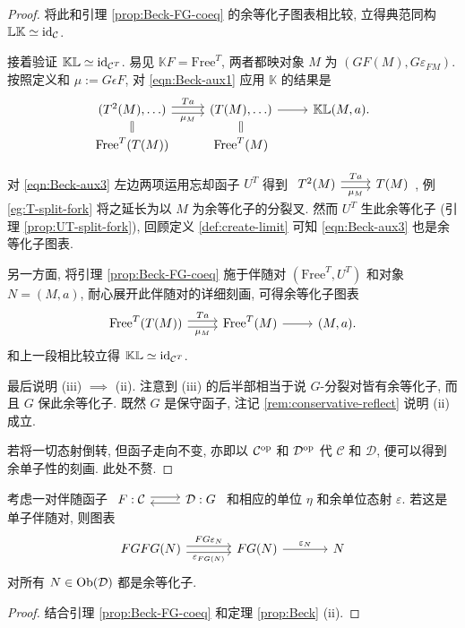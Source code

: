 \begin{proof}
	将此和引理 \ref{prop:Beck-FG-coeq} 的余等化子图表相比较, 立得典范同构 $\mathbb{L}\mathbb{K} \simeq \mathrm{id}_{\mathcal{C}}$.
	
	接着验证 $\mathbb{K}\mathbb{L} \simeq \mathrm{id}_{\mathcal{C}^T}$. 易见 $\mathbb{K}F = \mathrm{Free}^T$, 两者都映对象 $M$ 为 $(GF(M), G\varepsilon_{FM})$. 按照定义和 $\mu := G\epsilon F$, 对 \eqref{eqn:Beck-aux1} 应用 $\mathbb{K}$ 的结果是
	\begin{equation}\label{eqn:Beck-aux3}
		\begin{tikzcd}[row sep=small]
			(T^2(M), \ldots) \arrow[shift left, r, "Ta"] \arrow[shift right, r, "\mu_M"'] & (T(M), \ldots) \arrow[r] & \mathbb{K}\mathbb{L}(M, a). \\
			\mathrm{Free}^T(T(M)) \arrow[equal, u] & \mathrm{Free}^T(M) \arrow[equal, u] &
		\end{tikzcd}
	\end{equation}

	对 \eqref{eqn:Beck-aux3} 左边两项运用忘却函子 $U^T$ 得到
	$\begin{tikzcd}
		T^2(M) \arrow[shift left, r, "{Ta}"] \arrow[shift right, r, "{\mu_M}"'] & T(M)
	\end{tikzcd}$,
	例 \ref{eg:T-split-fork} 将之延长为以 $M$ 为余等化子的分裂叉. 然而 $U^T$ 生此余等化子 (引理 \ref{prop:UT-split-fork}), 回顾定义 \ref{def:create-limit} 可知 \eqref{eqn:Beck-aux3} 也是余等化子图表.
	
	另一方面, 将引理 \ref{prop:Beck-FG-coeq} 施于伴随对 $(\mathrm{Free}^T, U^T)$ 和对象 $N = (M, a)$, 耐心展开此伴随对的详细刻画, 可得余等化子图表
	\[\begin{tikzcd}[row sep=tiny]
		\mathrm{Free}^T(T(M)) \arrow[shift left, r, "Ta"] \arrow[shift right, r, "\mu_M"'] & \mathrm{Free}^T(M) \arrow[r] & (M, a).
	\end{tikzcd}\]
	和上一段相比较立得 $\mathbb{K}\mathbb{L} \simeq \mathrm{id}_{\mathcal{C}^T}$.
	
	最后说明 (iii) $\implies$ (ii). 注意到 (iii) 的后半部相当于说 $G$-分裂对皆有余等化子, 而且 $G$ 保此余等化子. 既然 $G$ 是保守函子, 注记 \ref{rem:conservative-reflect} 说明 (ii) 成立.
	
	若将一切态射倒转, 但函子走向不变, 亦即以 $\mathcal{C}^{\operatorname{op}}$ 和 $\mathcal{D}^{\operatorname{op}}$ 代 $\mathcal{C}$ 和 $\mathcal{D}$, 便可以得到余单子性的刻画. 此处不赘.
\end{proof}

\begin{corollary}
	考虑一对伴随函子
	$\begin{tikzcd}
		F: \mathcal{C} \arrow[shift left, r] & \mathcal{D}: G \arrow[shift left, l]
	\end{tikzcd}$
	和相应的单位 $\eta$ 和余单位态射 $\varepsilon$. 若这是单子伴随对, 则图表
	\[\begin{tikzcd}[column sep=large]
		FGFG(N) \arrow[shift left, r, "FG\varepsilon_N"] \arrow[shift right, r, "\varepsilon_{FG(N)}"'] & FG(N) \arrow[r, "\varepsilon_N"] & N
	\end{tikzcd}\]
	对所有 $N \in \operatorname{Ob}(\mathcal{D})$ 都是余等化子.
\end{corollary}
\begin{proof}
	结合引理 \ref{prop:Beck-FG-coeq} 和定理 \ref{prop:Beck} (ii).
\end{proof}

